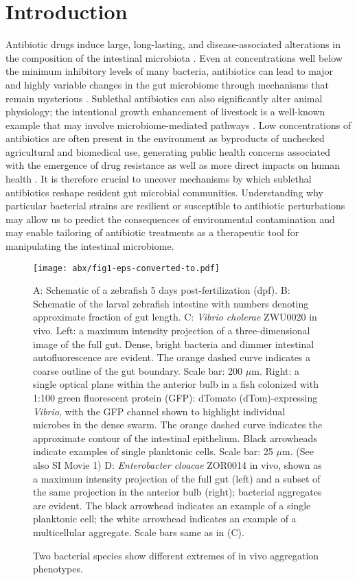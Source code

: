  \section{Introduction}


    Antibiotic drugs induce large, long-lasting, and disease-associated alterations in the composition of the intestinal microbiota \cite{relmanABX_2011,cho2012antibiotics,schulfer2019impact}. Even at concentrations well below the minimum inhibitory levels of many bacteria, antibiotics can lead to major and highly variable changes in the gut microbiome through mechanisms that remain mysterious \cite{cho2012antibiotics,schulfer2019impact,gaulke2016triclosan}. Sublethal antibiotics can also significantly alter animal physiology; the intentional growth enhancement of livestock is a well-known example that may involve microbiome-mediated pathways \cite{cho2012antibiotics}. Low concentrations of antibiotics are often present in the environment as byproducts of unchecked agricultural and biomedical use, generating public health concerns associated with the emergence of drug resistance \cite{andersson2014microbiological} as well as more direct impacts on human health \cite{national2018environmental}. It is therefore crucial to uncover mechanisms by which sublethal antibiotics reshape resident gut microbial communities. Understanding why particular bacterial strains are resilient or susceptible to antibiotic perturbations may allow us to predict the consequences of environmental contamination and may enable tailoring of antibiotic treatments as a therapeutic tool for manipulating the intestinal microbiome.  

\begin{figure}%
\centerline{
	\texttt{[image: abx/fig1-eps-converted-to.pdf]}}
	\caption{Two bacterial species show different extremes of in vivo aggregation phenotypes.}{  A: Schematic of a zebrafish 5 days post-fertilization (dpf). B: Schematic of the larval zebrafish intestine with numbers denoting approximate fraction of gut length. C: \textit{Vibrio cholerae} ZWU0020 in vivo. Left: a maximum intensity projection of a three-dimensional image of the full gut. Dense, bright bacteria and dimmer intestinal autofluorescence are evident. The orange dashed curve indicates a coarse outline of the gut boundary. Scale bar: 200 $\mu$m. Right: a single optical plane within the anterior bulb in a fish colonized with 1:100 green fluorescent protein (GFP): dTomato (dTom)-expressing \textit{Vibrio}, with the GFP channel shown to highlight individual microbes in the dense swarm. The orange dashed curve indicates the approximate contour of the intestinal epithelium. Black arrowheads indicate examples of single planktonic cells. Scale bar: 25 $\mu$m. (See also SI Movie 1) D: \textit{Enterobacter cloacae} ZOR0014 in vivo, shown as a maximum intensity projection of the full gut (left) and a subset of the same projection in the anterior bulb (right); bacterial aggregates are evident. The black arrowhead indicates an example of a single planktonic cell; the white arrowhead indicates an example of a multicellular aggregate. Scale bars same as in (C).}
\end{figure}


